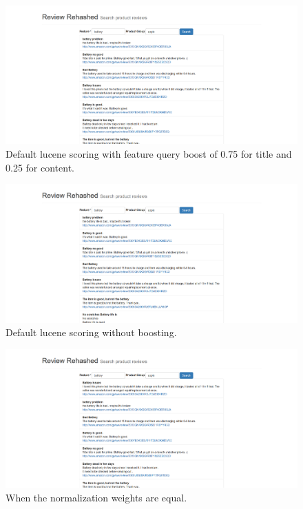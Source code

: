 \documentclass{article}
\begin{document}
\begin{figure}[ht!]
  \centering
  \includegraphics[width=1\textwidth]{noscoring}
  \caption{Default lucene scoring with feature query boost of 0.75 for title and 0.25 for content.~\label{fig:noscoring}}
\end{figure}

\begin{figure}[ht!]
  \centering
  \includegraphics[width=1\textwidth]{noboosting}
  \caption{Default lucene scoring without boosting.~\label{fig:noboosting}}
\end{figure}

\begin{figure}[ht!]
  \centering
  \includegraphics[width=1\textwidth]{equal_weights}
  \caption{When the normalization weights are equal.~\label{fig:equal_weights}}
\end{figure}
\end{document}
